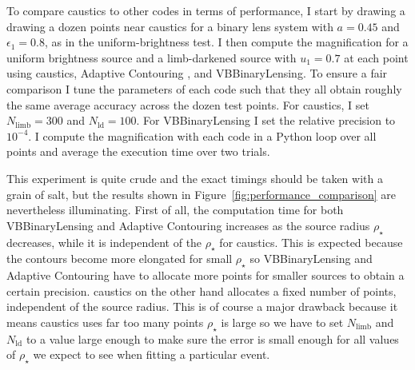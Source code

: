 \documentclass[12pt,dvipsnames]{report}
\newcommand{\ssf}[1]{\textsf{#1}}
\begin{document}
To compare \ssf{caustics} to other codes in terms of performance, I start by drawing a 
drawing a dozen points near caustics for a binary lens system with $a=0.45$ and $\epsilon_1=0.8$,
as in the uniform-brightness test. I then compute the magnification for 
a uniform brightness source and a limb-darkened source with $u_1=0.7$ at each point using 
\ssf{caustics}, \ssf{Adaptive Contouring} \citep{2007MNRAS.377.1679D}, and 
\ssf{VBBinaryLensing}. To ensure a fair comparison I tune the parameters of each code 
such that they all obtain roughly the same average accuracy across the dozen test points. For  
\ssf{caustics}, I set $N_\mathrm{limb}=300$ and $N_\mathrm{ld}=100$.
For \ssf{VBBinaryLensing} I set the relative precision to $10^{-4}$.
I compute the magnification with each code in a \ssf{Python} loop over all points and average 
the execution time over two trials. 

This experiment is quite crude and the exact timings should be taken with a grain of salt,
but the results shown in Figure~\ref{fig:performance_comparison} are nevertheless 
illuminating. First of all, the computation time for both \ssf{VBBinaryLensing} and 
\ssf{Adaptive Contouring} increases  as the source radius $\rho_\star$ decreases, while 
it is independent of the $\rho_\star$ for \ssf{caustics}. This is expected because the 
contours become more elongated for small $\rho_\star$ so \ssf{VBBinaryLensing} and
\ssf{Adaptive Contouring} have to allocate more points for smaller sources 
to obtain a certain precision. \ssf{caustics} on the other hand allocates a fixed number of points,
independent of the source radius. This is of course a major 
drawback because it means \ssf{caustics} uses far too many points $\rho_\star$ is large so 
we have to set $N_\mathrm{limb}$ and $N_\mathrm{ld}$ to a value large enough to make sure 
the error is small enough for all values of $\rho_\star$ we expect to see when fitting 
a particular event.
\end{document}
